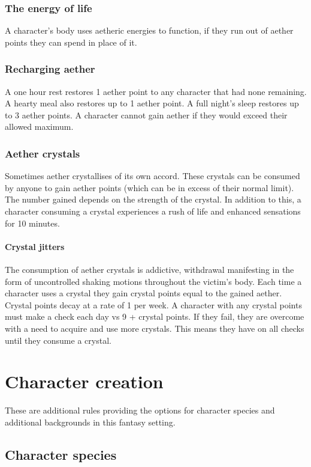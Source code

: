 \documentclass[a4paper,11pt,oneside]{book}
\newcommand{\textlf}[1]{\textbf{\titlecap{#1}}}
\begin{document}
\subsection{The energy of life}
A character's body uses aetheric energies to function, if they run out of aether points they can spend \textlf{endurance} in place of it.

\subsection{Recharging aether}
A one hour rest restores 1 aether point to any character that had none remaining. A hearty meal also restores up to 1 aether point. A full night's sleep restores up to 3 aether points. A character cannot gain aether if they would exceed their allowed maximum.

\subsection{Aether crystals}
Sometimes aether crystallises of its own accord. These crystals can be consumed by anyone to gain aether points (which can be in excess of their normal limit). The number gained depends on the strength of the crystal. In addition to this, a character consuming a crystal experiences a rush of life and enhanced sensations for 10 minutes.
\subsubsection{Crystal jitters}
The consumption of aether crystals is addictive, withdrawal manifesting in the form of uncontrolled shaking motions throughout the victim's body. Each time a character uses a crystal they gain crystal points equal to the gained aether. Crystal points decay at a rate of 1 per week. A character with any crystal points must make a \textlf{resolve} check each day vs 9 + crystal points. If they fail, they are overcome with a need to acquire and use more crystals. This means they have \textlf{edge-} on all checks until they consume a crystal.   




\chapter{Character creation}
These are additional rules providing the options for character species and additional backgrounds in this fantasy setting.

\section{Character species}
\end{document}

